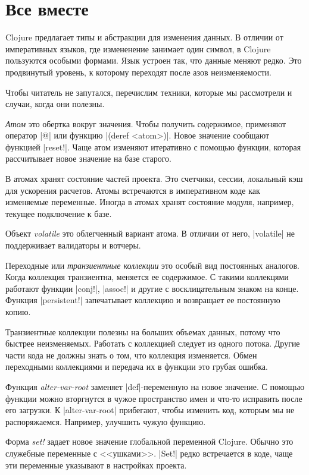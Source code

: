 \section{Все вместе}

Clojure предлагает типы и абстракции для изменения данных. В отличии от
императивных языков, где измененение занимает один символ, в Clojure пользуются
особыми формами. Язык устроен так, что данные меняют редко. Это продвинутый
уровень, к которому переходят после азов неизменяемости.

Чтобы читатель не запутался, перечислим техники, которые мы рассмотрели и
случаи, когда они полезны.

\emph{Атом} это обертка вокруг значения. Чтобы получить содержимое, применяют
оператор \spverb|@| или функцию \spverb|(deref <atom>)|. Новое значение сообщают
функцией \spverb|reset!|. Чаще атом изменяют итеративно с помощью функции,
которая рассчитывает новое значение на базе старого.

В атомах хранят состояние частей проекта. Это счетчики, сессии, локальный кэш
для ускорения расчетов. Атомы встречаются в императивном коде как изменяемые
переменные. Иногда в атомах хранят состояние модуля, например, текущее
подключение к базе.

Объект \emph{volatile} это облегченный вариант атома. В отличии от него,
\spverb|volatile| не поддерживает валидаторы и вотчеры.

Переходные или \emph{транзиентные коллекции} это особый вид постоянных
аналогов. Когда коллекция транзиентна, меняется ее содержимое. С такими
коллекцями работают функции \spverb|conj!|, \spverb|assoc!| и другие с
восклицательным знаком на конце. Функция \spverb|persistent!| запечатывает
коллекцию и возвращает ее постоянную копию.

Транзиентные коллекции полезны на больших объемах данных, потому что быстрее
неизменяемых. Работать с коллекцией следует из одного потока. Другие части кода
не должны знать о том, что коллекция изменяется. Обмен переходными коллекциями и
передача их в функции это грубая ошибка.

Функция \emph{alter-var-root} заменяет \spverb|def|-переменную на новое
значение. С помощью функции можно вторгнутся в чужое пространство имен и что-то
исправить после его загрузки. К \spverb|alter-var-root| прибегают, чтобы
изменить код, которым мы не распоряжаемся. Например, улучшить чужую функцию.

Форма \emph{set!} задает новое значение глобальной переменной Clojure. Обычно
это служебные переменные с <<ушками>>. \spverb|Set!| редко встречается в коде,
чаще эти переменные указывают в настройках проекта.

